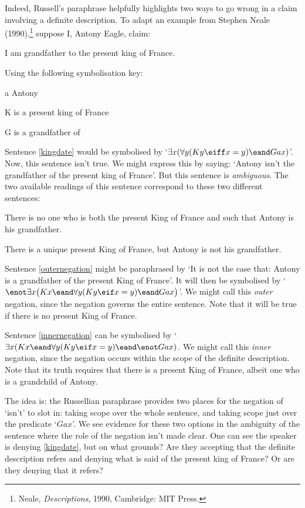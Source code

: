 Indeed, Russell's paraphrase helpfully highlights two ways to go wrong in a claim involving a definite description. To adapt an example from Stephen Neale (1990),\footnote{Neale, \emph{Descriptions}, 1990, Cambridge: MIT Press.}  suppose I, Antony Eagle, claim:
	\begin{earg}
		\item[\ex{kingdate}] I am grandfather to the present king of France.
	\end{earg}
Using the following symbolisation key:
	\begin{ekey}
		\item[a] Antony
		\item[K]  is a present king of France
		\item[G]  is a grandfather of 
	\end{ekey}
Sentence \ref{kingdate} would be symbolised by `$\exists x (\forall y(Ky \eiff  x = y) \eand Gax)$'. Now, this sentence isn't true. We might express this by saying: `Antony isn't the grandfather of the present king of France'. But this sentence is \emph{ambiguous}. The two available readings of this sentence correspond to these two different sentences:
	\begin{earg}
		\item[\ex{outernegation}] There is no one who is both the present King of France and  such that Antony is his grandfather.
		\item[\ex{innernegation}] There is a unique present King of France, but Antony is not his grandfather.
	\end{earg}
Sentence \ref{outernegation} might be paraphrased by `It is not the case that: Antony is a grandfather of the present King of France'. It will then be symbolised by `$\enot \exists x\bigl(Kx \eand \forall y(Ky \eif  x = y) \eand Gax \bigr)$'. We might call this \emph{outer} negation, since the negation governs the entire sentence. Note that it will be true if there is no present King of France.

Sentence \ref{innernegation} can be symbolised by `$\exists x (Kx \eand \forall y(Ky \eif x = y) \eand \enot Gax)$. We might call this \emph{inner} negation, since the negation occurs within the scope of the definite description. Note that its truth requires that there is a present King of France, albeit one who is a grandchild of Antony.

The idea is: the Russellian paraphrase provides two places for the negation of `isn't' to slot in: taking scope over the whole sentence, and taking scope just over the predicate `$Gax$'.  We see evidence for these two options in the ambiguity of the sentence where the role of the negation isn't made clear. One can see the speaker is denying \ref{kingdate}, but on what grounds? Are they accepting that the definite description refers and denying what is said of the present king of France? Or are they denying that it refers?


